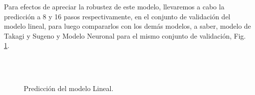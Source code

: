\documentclass[12pt]{article}
\begin{document}
Para efectos de apreciar la robustez de este modelo, llevaremos a cabo la predicción a 8 y 16 pasos respectivamente, en el conjunto de validación del modelo lineal, para luego compararlos con los demás modelos, a saber, modelo de Takagi y Sugeno y Modelo Neuronal para el mismo conjunto de validación, Fig. \ref{f_G456}.
\begin{figure}[h!]
		\centering
		\captionsetup{justification=centering}
		\\
		\\
		\caption{Predicción del modelo Lineal.}
		\label{f_G456}
\end{figure}
\end{document}
